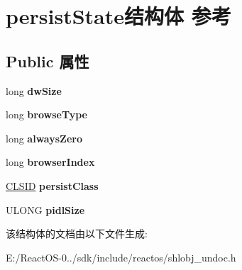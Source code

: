 \hypertarget{structpersist_state}{}\section{persist\+State结构体 参考}
\label{structpersist_state}
\subsection*{Public 属性}
\begin{DoxyCompactItemize}
\item 
\mbox{\label{structpersist_state_a43e2050add4b3c46d90ba6bfd323752e}} 
long {\bfseries dw\+Size}
\item 
\mbox{\label{structpersist_state_a5190eb7616e9c885031d81fe19676c41}} 
long {\bfseries browse\+Type}
\item 
\mbox{\label{structpersist_state_a35b07fd2477c521eea5c2419c67a9c3c}} 
long {\bfseries always\+Zero}
\item 
\mbox{\label{structpersist_state_a84bad4ef92d6f8f0a63adb06a06b978c}} 
long {\bfseries browser\+Index}
\item 
\mbox{\label{structpersist_state_a7797e9b33415bfe5b91a03d0458ed909}} 
\hyperlink{struct___i_i_d}{C\+L\+S\+ID} {\bfseries persist\+Class}
\item 
\mbox{\label{structpersist_state_ad7642ac22f13b5df6ca7a1343939aca4}} 
U\+L\+O\+NG {\bfseries pidl\+Size}
\end{DoxyCompactItemize}


该结构体的文档由以下文件生成\+:\begin{DoxyCompactItemize}
\item 
E\+:/\+React\+O\+S-\/0../sdk/include/reactos/shlobj\+\_\+undoc.\+h\end{DoxyCompactItemize}
